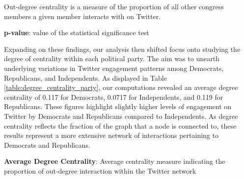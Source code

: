 \documentclass[11pt]{article}
\begin{document}
\begin{table}[h]
\caption{ANOVA test of association between chamber affiliation and out-degree centrality}
\label{table:anova_1}
\begin{threeparttable}
\renewcommand{\TPTminimum}{\linewidth}
\begin{tablenotes}
\footnotesize
\item Out-degree centrality is a measure of the proportion of all other congress members a given member interacts with on Twitter.
\item \textbf{p-value}: value of the statistical significance test
\end{tablenotes}
\end{threeparttable}
\end{table}


Expanding on these findings, our analysis then shifted focus onto studying the degree of centrality within each political party. The aim was to unearth underlying variations in Twitter engagement patterns among Democrats, Republicans, and Independents. As displayed in Table \ref{table:degree_centrality_party}, our computations revealed an average degree centrality of 0.117 for Democrats, 0.0717 for Independents, and 0.119 for Republicans. These figures highlight slightly higher levels of engagement on Twitter by Democrats and Republicans compared to Independents. As degree centrality reflects the fraction of the graph that a node is connected to, these results represent a more extensive network of interactions pertaining to Democrats and Republicans.

\begin{table}[h]
\caption{Degree centrality by political party}
\label{table:degree_centrality_party}
\begin{threeparttable}
\renewcommand{\TPTminimum}{\linewidth}
\begin{tablenotes}
\footnotesize
\item \textbf{Average Degree Centrality}: Average centrality measure indicating the proportion of out-degree interaction within the Twitter network
\end{tablenotes}
\end{threeparttable}
\end{table}
\end{document}
